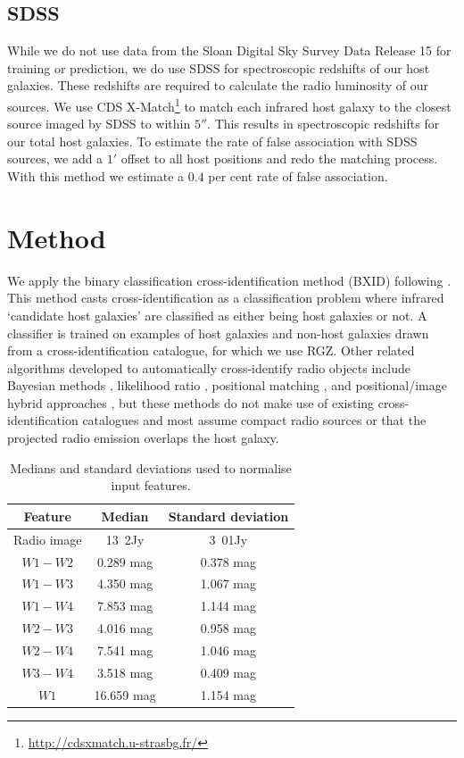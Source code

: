     \subsection{SDSS} \label{sec:rlfs-sdss-data}

    While we do not use data from the Sloan Digital Sky Survey Data Release 15 \citep[SDSS;][]{sdss} for training or prediction, we do use SDSS for spectroscopic redshifts of our host galaxies. These redshifts are required to calculate the radio luminosity of our sources. We use CDS X-Match\footnote{\url{http://cdsxmatch.u-strasbg.fr/}} to match each infrared host galaxy to the closest source imaged by SDSS to within $5''$. This results in \nsourceszsp{} spectroscopic redshifts for our \nsources{} total host galaxies. To estimate the rate of false association with SDSS sources, we add a $1'$ offset to all host positions and redo the matching process. With this method we estimate a $0.4$ per cent rate of false association.

\section{Method}\label{sec:rlfs-method}
    
We apply the binary classification cross-identification method (BXID) following \citet{alger18radio}. This method casts cross-identification
as a classification problem where infrared `candidate host galaxies' are
classified as either being host galaxies or not. A classifier is trained
on examples of host galaxies and non-host galaxies drawn from a
cross-identification catalogue, for which we use RGZ. Other related
algorithms developed to automatically cross-identify radio objects
include Bayesian methods \citep{fan15}, likelihood ratio \citep{weston18lrpy},
 positional matching \citep[e.g.][]{kimball08, norris06, middelberg08}, and positional/image hybrid approaches \citep{van_velzen_radio_2012}, but these methods do not make use of existing
cross-identification catalogues and most assume compact radio sources or that the projected radio emission overlaps the host galaxy.

\begin{table}
  \caption{Medians and standard deviations used to normalise input features.
    \label{tab:medians-stdevs}}
    \centering
  \begin{tabular}{ccc}
    \hline\hline
    Feature & Median & Standard deviation\\
    \hline
    Radio image & \unit{13.2}{\micro{}Jy} & \unit{3.01}{\milli{}Jy}\\
    $W1 - W2$ & 0.289 mag & 0.378 mag\\
    $W1 - W3$ & 4.350 mag & 1.067 mag\\
    $W1 - W4$ & 7.853 mag & 1.144 mag\\
    $W2 - W3$ & 4.016 mag & 0.958 mag\\
    $W2 - W4$ & 7.541 mag & 1.046 mag\\
    $W3 - W4$ & 3.518 mag & 0.409 mag\\
    $W1$ & 16.659 mag & 1.154 mag\\
    \hline\hline
  \end{tabular}
\end{table}

